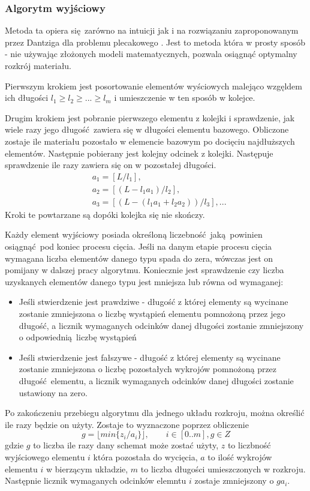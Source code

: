 \subsubsection{Algorytm wyjściowy}
Metoda ta opiera się zarówno na intuicji jak i na rozwiązaniu zaproponowanym przez Dantziga dla problemu plecakowego \cite{DantzigArticle}. Jest to metoda która w prosty sposób - nie używając złożonych modeli matematycznych, pozwala osiągnąć optymalny rozkrój materiału.

Pierwszym krokiem jest posortowanie elementów wyściowych malejąco wzgęldem ich długości $l_1 \ge l_2 \ge ... \ge l_m$ i umieszczenie w ten sposób w kolejce.

Drugim krokiem jest pobranie pierwszego elementu z kolejki i sprawdzenie, jak wiele razy jego długość zawiera się w długości elementu bazowego. Obliczone zostaje ile materiału pozostało w elemencie bazowym po docięciu najdłuższych elementów. Następnie pobierany jest kolejny odcinek z kolejki. Następuje sprawdzenie ile razy zawiera się on w pozostałej długości.
\begin{equation}\label{base_dantizg}
\begin{split}
& a_1 = [L/l_1],\\
& a_2 = [(L-l_1 a_1)/l_2],\\
& a_3 = [(L-(l_1 a_1+l_2 a_2))/l_3], ...
\end{split}
\end{equation}
Kroki te powtarzane są dopóki kolejka się nie skończy.

Każdy element wyjściowy posiada określoną liczebność jaką powinien osiągnąć pod koniec procesu cięcia. Jeśli na danym etapie procesu cięcia wymagana liczba elementów danego typu spada do zera, wówczas jest on pomijany w dalszej pracy algorytmu. Koniecznie jest sprawdzenie czy liczba uzyskanych elementów danego typu jest mniejsza lub równa od wymaganej:
\begin{itemize}
  \item Jeśli stwierdzenie jest prawdziwe - długość z której elementy są wycinane zostanie zmniejszona o liczbę wystąpień elementu pomnożoną przez jego długość, a licznik wymaganych odcinków danej długości zostanie zmniejszony o odpowiednią liczbę wystąpień
  \item Jeśli stwierdzenie jest fałszywe - długość z której elementy są wycinane zostanie zmniejszona o liczbę pozostałych wykrojów pomnożoną przez długość elementu, a licznik wymaganych odcinków danej długości zostanie ustawiony na zero.
\end{itemize}
Po zakończeniu przebiegu algorytmu dla jednego układu rozkroju, można określić ile razy będzie on użyty. Zostaje to wyznaczone poprzez obliczenie
\begin{equation}
g = \lfloor min\{z_i/a_i\} \rfloor, \qquad i \in [0..m], g \in Z
\end{equation}
gdzie $g$ to liczba ile razy dany schemat może zostać użyty, $z$ to liczbność wyjściowego elementu $i$ która pozostała do wycięcia, $a$ to ilość wykrojów elementu $i$ w bierzącym układzie, $m$ to liczba długości umieszczonych w rozkroju. Następnie licznik wymaganych odcinków elemntu $i$ zostaje zmniejszony o $g a_i$.

